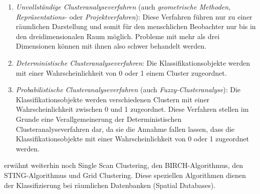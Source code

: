 \begin{enumerate}
	\item \textit{Unvollständige Clusteranalyseverfahren} (auch \textit{geometrische Methoden}, \textit{Repräsentations-} oder \textit{Projektverfahren}): Diese Verfahren führen nur zu einer räumlichen Darstellung und somit für den menschlichen Beobachter nur bis in den dreidimensionalen Raum möglich. Probleme mit mehr als drei Dimensionen können mit ihnen also schwer behandelt werden.
	\item \textit{Deterministische Clusteranalyseverfahren}: Die Klassifikationsobjekte werden mit einer Wahrscheinlichkeit von 0 oder 1 einem Cluster zugeordnet. 
	\item \textit{Probabilistische Clusteranalyseverfahren} (auch \textit{Fuzzy-Clusteranalyse}): Die Klassifikationsobjekte werden verschiedenen Clustern mit einer Wahrscheinlichkeit zwischen 0 und 1 zugeordnet. Diese Verfahren stellen im Grunde eine Verallgemeinerung der Deterministischen Clusteranalyseverfahren dar, da sie die Annahme fallen lassen, dass die Klassifikationsobjekte mit einer Wahrscheinlichkeit von 0 oder 1 zugeordnet werden.
\end{enumerate}

\citet{Xu.1999} erwähnt weiterhin noch Single Scan Clustering, den BIRCH-Algorithmus, den STING-Algorithmus und Grid Clustering. Diese speziellen Algorithmen dienen der Klassifizierung bei räumlichen Datenbanken (Spatial Databases).